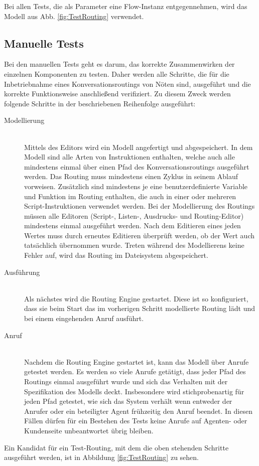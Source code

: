 Bei allen Tests, die als Parameter eine Flow-Instanz entgegennehmen, wird das Modell aus Abb. \ref{fig:TestRouting} verwendet. 

\subsection{Manuelle Tests}
Bei den manuellen Tests geht es darum, das korrekte Zusammenwirken der einzelnen Komponenten zu testen. Daher werden alle Schritte, die für die Inbetriebnahme eines Konversationsroutings von Nöten sind, ausgeführt und die korrekte Funktionsweise anschließend verifiziert. Zu diesem Zweck werden folgende Schritte in der beschriebenen Reihenfolge ausgeführt:
\begin{description}
\item[Modellierung] \hfill \\
Mittels des Editors wird ein Modell angefertigt und abgespeichert. In dem Modell sind alle Arten von Instruktionen enthalten, welche auch alle mindestens einmal über einen Pfad des Konversationsroutings ausgeführt werden. Das Routing muss mindestens einen Zyklus in seinem Ablauf vorweisen. Zusätzlich sind mindestens je eine benutzerdefinierte Variable und Funktion im Routing enthalten, die auch in einer oder mehreren Script-Instruktionen verwendet werden. Bei der Modellierung des Routings müssen alle Editoren (Script-, Listen-, Ausdrucks- und Routing-Editor) mindestens einmal ausgeführt werden. Nach dem Editieren eines jeden Wertes muss durch erneutes Editieren überprüft werden, ob der Wert auch tatsächlich übernommen wurde. Treten während des Modellierens keine Fehler auf, wird das Routing im Dateisystem abgespeichert. 
\item[Ausführung] \hfill \\
Als nächstes wird die Routing Engine gestartet. Diese ist so konfiguriert, dass sie beim Start das im vorherigen Schritt modellierte Routing lädt und bei einem eingehenden Anruf ausführt.
\item[Anruf] \hfill \\
Nachdem die Routing Engine gestartet ist, kann das Modell über Anrufe getestet werden. Es werden so viele Anrufe getätigt, dass jeder Pfad des Routings einmal ausgeführt wurde und sich das Verhalten mit der Spezifikation des Modells deckt. Insbesondere wird stichprobenartig für jeden Pfad getestet, wie sich das System verhält wenn entweder der Anrufer oder ein beteiligter Agent frühzeitig den Anruf beendet. In diesen Fällen dürfen für ein Bestehen des Tests keine Anrufe auf Agenten- oder Kundenseite unbeantwortet übrig bleiben.
\end{description}
Ein Kandidat für ein Test-Routing, mit dem die oben stehenden Schritte ausgeführt werden, ist in Abbildung \ref{fig:TestRouting} zu sehen.

